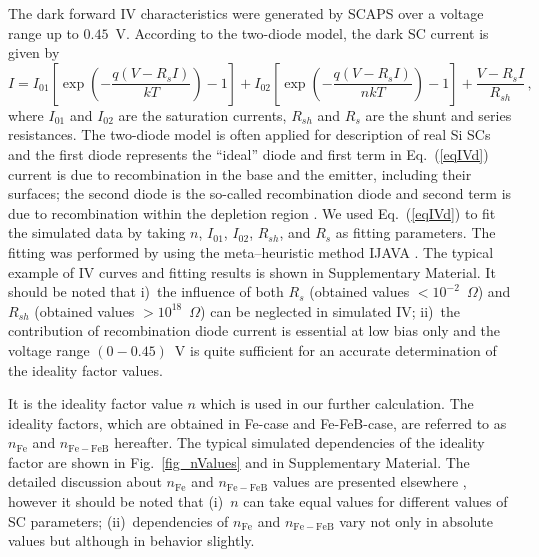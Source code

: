 \documentclass[num-refs]{wiley-article} %
\begin{document}
The dark forward IV characteristics were generated by SCAPS over a voltage range up to $0.45$~V.
According to the two-diode model, the dark SC current is given by \citep{Breitenstein2013}
\begin{equation}
\label{eqIVd}
    I=I_{01}\left[\exp\left(-\frac{q(V-R_sI)}{kT}\right)-1\right]
      + I_{02}\left[\exp\left(-\frac{q(V-R_sI)}{nkT}\right)-1\right]
      +\frac{V-R_sI}{R_{sh}}\,,
\end{equation}
where
$I_{01}$ and $I_{02}$ are the saturation currents,
$R_{sh}$ and $R_s$ are the shunt and series resistances.
The two-diode model is often applied for description of real Si SCs
and the first diode represents the ``ideal'' diode and
first term in Eq.~(\ref{eqIVd})
current is due to recombination in the base
and the emitter, including their surfaces;
the second diode is the so-called recombination diode
and second term is due to recombination within
the depletion region \citep{Breitenstein2013}.
We used Eq.~(\ref{eqIVd}) to fit the simulated data by taking $n$, $I_{01}$, $I_{02}$,
$R_{sh}$, and $R_s$ as fitting parameters.
The fitting was performed by using the meta--heuristic method IJAVA \cite{IJAVA}.
The typical example of IV curves and fitting results is shown
in Supplementary Material.
It should be noted that
i)~the influence of both $R_s$ (obtained values $<10^{-2}$~$\Omega$) and $R_{sh}$
(obtained values $>10^{18}$~$\Omega$) can be neglected in simulated IV;
ii)~the contribution of recombination diode current is essential at low bias only
and the voltage range $(0-0.45)$~V is quite sufficient for an accurate determination of the ideality factor values.

It is the ideality factor value $n$ which is used in our further calculation.
The ideality factors, which are obtained in  Fe-case and Fe-FeB-case,
are referred to as  $n_\mathrm{Fe}$ and $n_\mathrm{Fe-FeB}$ hereafter.
The typical simulated dependencies of  the ideality factor are shown in Fig.~\ref{fig_nValues}
and in Supplementary Material.
The detailed discussion about $n_\mathrm{Fe}$ and $n_\mathrm{Fe-FeB}$  values are presented elsewhere \cite{OlikhJPS},
however it should be noted that
(i)~$n$ can take equal values for different  values of SC parameters;
(ii)~dependencies of $n_\mathrm{Fe}$ and $n_\mathrm{Fe-FeB}$ vary not only in absolute values but although in behavior slightly.
\end{document}
